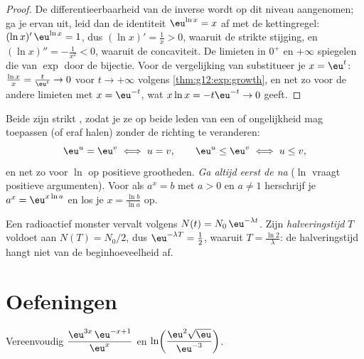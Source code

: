 \begin{proof}
De differentieerbaarheid van de inverse  wordt op dit niveau
aangenomen; ga je ervan uit, leid dan de identiteit $\eu^{\ln x} = x$ af met
de kettingregel: $(\ln x)'\,\eu^{\ln x} = 1$, dus $(\ln x)' = \frac{1}{x} > 0$,
waaruit de strikte stijging, en $(\ln x)'' = -\frac1{x^2} < 0$, waaruit de
concaviteit. De limieten in $0^+$ en $+\infty$ spiegelen die van $\exp$ door
de bijectie. Voor de vergelijking van  substitueer je
$x = \eu^{t}$: $\frac{\ln x}{x} = \frac{t}{\eu^t} \to 0$ voor
$t \to +\infty$ volgens \cref{thm:g12:exp:growth}, en net zo voor de andere
limieten met $x = \eu^{-t}$, wat $x\ln x = -t\eu^{-t} \to 0$ geeft.
\end{proof}

\begin{method}\label{met:g12:exp:equations}
Beide  zijn strikt , zodat je ze op beide leden van een
 of ongelijkheid mag toepassen (of eraf halen) zonder de richting
te veranderen:
\[
\eu^{u} = \eu^{v} \iff u = v, \qquad
\eu^{u} \leq \eu^{v} \iff u \leq v,
\]
en net zo voor $\ln$ op positieve grootheden. \emph{Ga altijd eerst de
 na} ($\ln$ vraagt positieve argumenten). Voor  als
$a^x = b$ met $a>0$ en $a \neq 1$ herschrijf je $a^x = \eu^{x\ln a}$ en los je
$x = \frac{\ln b}{\ln a}$ op.
\end{method}

\begin{example}\label{ex:g12:exp:halflife}
Een radioactief monster vervalt volgens $N(t) = N_0\,\eu^{-\lambda t}$. Zijn
\emph{halveringstijd} $T$ voldoet aan $N(T) = N_0/2$, dus
$\eu^{-\lambda T} = \frac12$, waaruit $T = \frac{\ln 2}{\lambda}$: de
halveringstijd hangt niet van de beginhoeveelheid af.
\end{example}

\section{Oefeningen}

\begin{exercise}[$\star$]\label{exo:g12:exp:1}
Vereenvoudig $\dfrac{\eu^{3x}\,\eu^{-x+1}}{\eu^{x}}$ en
$\ln\!\left(\dfrac{\eu^2\sqrt{\eu}}{\eu^{-3}}\right)$.
\end{exercise}

